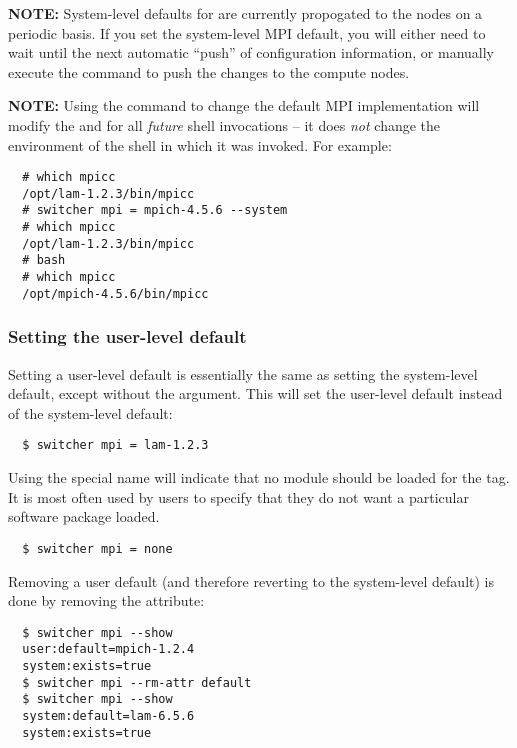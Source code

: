 {\bf NOTE:} System-level defaults for  are currently
propogated to the nodes on a periodic basis.  If you set the
system-level MPI default, you will either need to wait until the next
automatic ``push'' of configuration information, or manually execute
the  command to push the changes to
the compute nodes.

{\bf NOTE:} Using the  command to change the default MPI
implementation will modify the  and  for all
{\em future} shell invocations -- it does {\em not} change the
environment of the shell in which it was invoked.  For example:

\begin{verbatim}
  # which mpicc
  /opt/lam-1.2.3/bin/mpicc
  # switcher mpi = mpich-4.5.6 --system
  # which mpicc
  /opt/lam-1.2.3/bin/mpicc
  # bash
  # which mpicc
  /opt/mpich-4.5.6/bin/mpicc
\end{verbatim}


\subsubsection{Setting the user-level default}

Setting a user-level default is essentially the same as setting the
system-level default, except without the  argument.
This will set the user-level default instead of the system-level
default:

\begin{verbatim}
  $ switcher mpi = lam-1.2.3
\end{verbatim}


Using the special name  will indicate that no module should
be loaded for the  tag.  It is most often used by users to
specify that they do not want a particular software package loaded.

\begin{verbatim}
  $ switcher mpi = none
\end{verbatim}


Removing a user default (and therefore reverting to the system-level
default) is done by removing the  attribute:

\begin{verbatim}
  $ switcher mpi --show
  user:default=mpich-1.2.4
  system:exists=true
  $ switcher mpi --rm-attr default
  $ switcher mpi --show
  system:default=lam-6.5.6
  system:exists=true
\end{verbatim}

